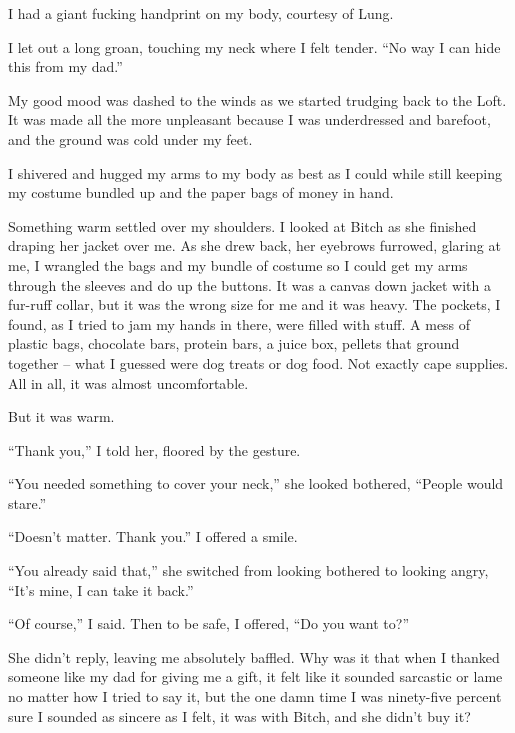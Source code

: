 I had a giant fucking handprint on my body, courtesy of Lung.



I let out a long groan, touching my neck where I felt tender.  ``No way I can hide this from my dad.''



My good mood was dashed to the winds as we started trudging back to the Loft.  It was made all the more unpleasant because I was underdressed and barefoot, and the ground was cold under my feet.



I shivered and hugged my arms to my body as best as I could while still keeping my costume bundled up and the paper bags of money in hand.



Something warm settled over my shoulders.  I looked at Bitch as she finished draping her jacket over me.  As she drew back, her eyebrows furrowed, glaring at me, I wrangled the bags and my bundle of costume so I could get my arms through the sleeves and do up the buttons.  It was a canvas down jacket with a fur-ruff collar, but it was the wrong size for me and it was heavy.  The pockets, I found, as I tried to jam my hands in there, were filled with stuff.  A mess of plastic bags, chocolate bars, protein bars, a juice box, pellets that ground together – what I guessed were dog treats or dog food.  Not exactly cape supplies.  All in all, it was almost uncomfortable.



But it was warm.



``Thank you,'' I told her, floored by the gesture.



``You needed something to cover your neck,'' she looked bothered, ``People would stare.''



``Doesn't matter.  Thank you.''  I offered a smile.



``You already said that,'' she switched from looking bothered to looking angry, ``It's mine, I can take it back.''



``Of course,'' I said.  Then to be safe, I offered, ``Do you want to?''



She didn't reply, leaving me absolutely baffled.  Why was it that when I thanked someone like my dad for giving me a gift, it felt like it sounded sarcastic or lame no matter how I tried to say it, but the one damn time I was ninety-five percent sure I sounded as sincere as I felt, it was with Bitch, and she didn't buy it?



